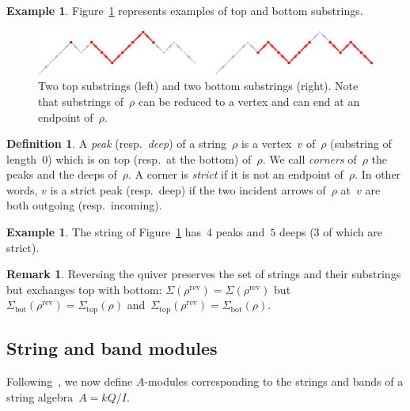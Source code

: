 \documentclass{memo-l}
\theoremstyle{definition}
\newtheorem{definition}[theorem]{Definition}
\newtheorem{example}[theorem]{Example}
\newtheorem{remark}[theorem]{Remark}
\newcommand{\fref}[1]{Figure~\ref{#1}} %
\newcommand{\darkblue}{\color{darkblue}} %
\newcommand{\defn}[1]{\textsl{\darkblue #1}} %
\newcommand{\reversed}[1]{#1^{\mathrm{rev}}} %
\renewcommand{\top}{\mathrm{top}} %
\newcommand{\bottom}{\mathrm{bot}} %
\begin{document}
\begin{example}
\fref{fig:exmTopBottom} represents examples of top and bottom substrings.

\begin{figure}[h]
	\capstart
	\centerline{\includegraphics[scale=.3]{exmTopBottom}}
	\caption{Two top substrings (left) and two bottom substrings (right). Note that substrings of~$\rho$ can be reduced to a vertex and can end at an endpoint of~$\rho$.}
	\label{fig:exmTopBottom}
\end{figure}
\end{example}

\begin{definition}
A \defn{peak} (resp.~\defn{deep}) of a string~$\rho$ is a vertex~$v$ of~$\rho$ (substring of length~$0$) which is on top (resp.~at the bottom) of~$\rho$.
We call \defn{corners} of~$\rho$ the peaks and the deeps of~$\rho$.
A corner is \defn{strict} if it is not an endpoint of~$\rho$.
In other words, $v$ is a strict peak (resp.~deep) if the two incident arrows of~$\rho$ at~$v$ are both outgoing (resp.~incoming).
\end{definition}

\begin{example}
The string of \fref{fig:exmTopBottom} has~$4$ peaks and~$5$ deeps ($3$ of which are strict).
\end{example}

\begin{remark}
\label{rem:reverseStrings}
Reversing the quiver preserves the set of strings and their substrings but exchanges top with bottom:
$\Sigma(\reversed{\rho}) = \Sigma(\reversed{\rho})$ but~$\Sigma_\bottom(\reversed{\rho}) = \Sigma_\top(\rho)$ and~$\Sigma_\top(\reversed{\rho}) = \Sigma_\bottom(\rho)$.
\end{remark}

\subsection{String and band modules}
\label{subsec:stringBandModules}

Following~\cite{ButlerRingel}, we now define $A$-modules corresponding to the strings and bands of a string algebra~$A = kQ/I$.
\end{document}
